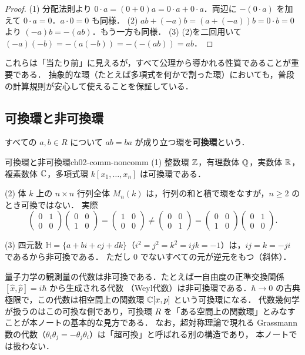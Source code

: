 \begin{proof}
(1) 分配法則より $0\cdot a=(0+0)a=0\cdot a+0\cdot a$．両辺に $-(0\cdot a)$ を加えて $0\cdot a=0$．$a\cdot 0=0$ も同様．
(2) $ab+(-a)b=(a+(-a))b=0\cdot b=0$ より $(-a)b=-(ab)$．もう一方も同様．
(3) (2)を二回用いて $(-a)(-b)=-(a(-b))=-(-(ab))=ab$．
\end{proof}

これらは「当たり前」に見えるが，すべて公理から導かれる性質であることが重要である．
抽象的な環（たとえば多項式を何かで割った環）においても，普段の計算規則が安心して使えることを保証している．

\subsection{可換環と非可換環}

すべての $a,b\in R$ について $ab=ba$ が成り立つ環を\textbf{可換環}という．

\begin{myex}{可換環と非可換環}{ch02-comm-noncomm}
(1) 整数環 $\mathbb{Z}$，有理数体 $\mathbb{Q}$，実数体 $\mathbb{R}$，複素数体 $\mathbb{C}$，多項式環 $k[x_1,\dots,x_n]$ は可換環である．

(2) 体 $k$ 上の $n\times n$ 行列全体 $M_n(k)$ は，行列の和と積で環をなすが，$n\ge2$ のとき可換ではない．
実際
\[
  \begin{pmatrix}0&1\\0&0\end{pmatrix}\begin{pmatrix}0&0\\1&0\end{pmatrix}=\begin{pmatrix}1&0\\0&0\end{pmatrix}
  \ne\begin{pmatrix}0&0\\0&1\end{pmatrix}=\begin{pmatrix}0&0\\1&0\end{pmatrix}\begin{pmatrix}0&1\\0&0\end{pmatrix}.
\]

(3) 四元数 $\mathbb H=\{a+bi+cj+dk\}$（$i^2=j^2=k^2=ijk=-1$）は，$ij=k=-ji$ であるから非可換である．
ただし $0$ でないすべての元が逆元をもつ（斜体）．
\end{myex}

\begin{physbox}[可換性と古典・量子]
量子力学の観測量の代数は非可換である．たとえば一自由度の正準交換関係 $[\hat x,\hat p]=i\hbar$ から生成される代数
（Weyl代数）は非可換環である．$\hbar\to0$ の古典極限で，この代数は相空間上の関数環 $\mathbb{C}[x,p]$ という可換環になる．
代数幾何学が扱うのはこの可換な側であり，可換環 $R$ を「ある空間上の関数環」とみなすことが本ノートの基本的な見方である．
なお，超対称理論で現れる Grassmann 数の代数（$\theta_i\theta_j=-\theta_j\theta_i$）は「超可換」と呼ばれる別の構造であり，
本ノートでは扱わない．
\end{physbox}

